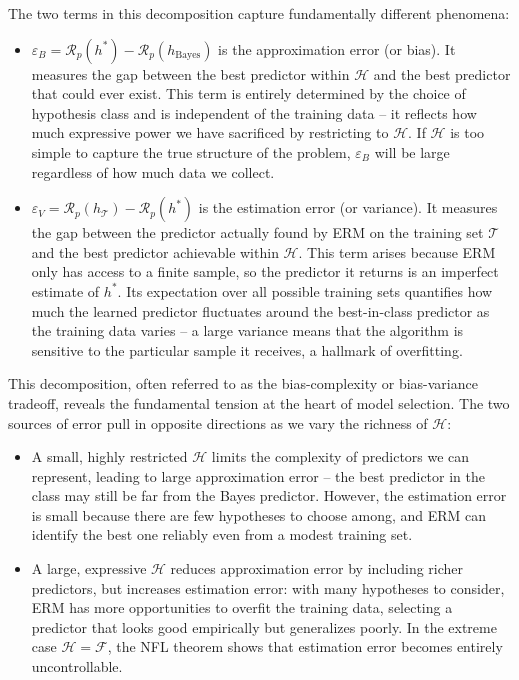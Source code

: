 The two terms in this decomposition capture fundamentally different phenomena:

\begin{itemize}
\item $\varepsilon_B = \mathcal{R}_p(h^*) - \mathcal{R}_p(h_\text{Bayes})$ is the \alert{approximation error} (or \alert{bias}). It measures the gap between the best predictor within $\mathcal{H}$ and the best predictor that could ever exist. This term is entirely determined by the choice of hypothesis class and is independent of the training data -- it reflects how much expressive power we have sacrificed by restricting to $\mathcal{H}$. If $\mathcal{H}$ is too simple to capture the true structure of the problem, $\varepsilon_B$ will be large regardless of how much data we collect.

\item $\varepsilon_V = \mathcal{R}_p(h_{\mathcal{T}}) - \mathcal{R}_p(h^*)$ is the \alert{estimation error} (or \alert{variance}). It measures the gap between the predictor actually found by ERM on the training set $\mathcal{T}$ and the best predictor achievable within $\mathcal{H}$. This term arises because ERM only has access to a finite sample, so the predictor it returns is an imperfect estimate of $h^*$. Its expectation over all possible training sets quantifies how much the learned predictor fluctuates around the best-in-class predictor as the training data varies -- a large variance means that the algorithm is sensitive to the particular sample it receives, a hallmark of overfitting.
\end{itemize}

This decomposition, often referred to as the \alert{bias-complexity} or bias-variance tradeoff, reveals the fundamental tension at the heart of model selection. The two sources of error pull in opposite directions as we vary the richness of $\mathcal{H}$:

\begin{itemize}
    \item A small, highly restricted $\mathcal{H}$ limits the complexity of predictors we can represent, leading to large approximation error -- the best predictor in the class may still be far from the Bayes predictor. However, the estimation error is small because there are few hypotheses to choose among, and ERM can identify the best one reliably even from a modest training set.
    \item A large, expressive $\mathcal{H}$ reduces approximation error by including richer predictors, but increases estimation error: with many hypotheses to consider, ERM has more opportunities to overfit the training data, selecting a predictor that looks good empirically but generalizes poorly. In the extreme case $\mathcal{H} = \mathcal{F}$, the NFL theorem shows that estimation error becomes entirely uncontrollable.
\end{itemize}

